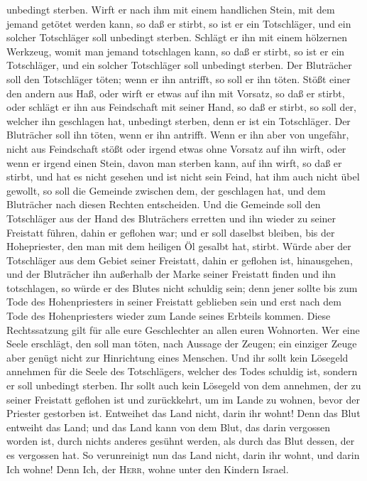 unbedingt sterben.  Wirft er nach ihm mit einem
handlichen Stein, mit dem jemand getötet werden kann, so daß er stirbt,
so ist er ein Totschläger, und ein solcher Totschläger soll unbedingt
sterben.  Schlägt er ihn mit einem hölzernen Werkzeug,
womit man jemand totschlagen kann, so daß er stirbt, so ist er ein
Totschläger, und ein solcher Totschläger soll unbedingt sterben.
 Der Bluträcher soll den Totschläger töten; wenn er ihn
antrifft, so soll er ihn töten.  Stößt einer den andern
aus Haß, oder wirft er etwas auf ihn mit Vorsatz, so daß er stirbt,
 oder schlägt er ihn aus Feindschaft mit seiner Hand, so
daß er stirbt, so soll der, welcher ihn geschlagen hat, unbedingt
sterben, denn er ist ein Totschläger. Der Bluträcher soll ihn töten,
wenn er ihn antrifft.  Wenn er ihn aber von ungefähr,
nicht aus Feindschaft stößt oder irgend etwas ohne Vorsatz auf ihn
wirft,  oder wenn er irgend einen Stein, davon man
sterben kann, auf ihn wirft, so daß er stirbt, und hat es nicht gesehen
und ist nicht sein Feind, hat ihm auch nicht übel gewollt,
 so soll die Gemeinde zwischen dem, der geschlagen hat,
und dem Bluträcher nach diesen Rechten entscheiden.  Und
die Gemeinde soll den Totschläger aus der Hand des Bluträchers erretten
und ihn wieder zu seiner Freistatt führen, dahin er geflohen war; und er
soll daselbst bleiben, bis der Hohepriester, den man mit dem heiligen Öl
gesalbt hat, stirbt.  Würde aber der Totschläger aus dem
Gebiet seiner Freistatt, dahin er geflohen ist, 
hinausgehen, und der Bluträcher ihn außerhalb der Marke seiner Freistatt
finden und ihn totschlagen, so würde er des Blutes nicht schuldig sein;
 denn jener sollte bis zum Tode des Hohenpriesters in
seiner Freistatt geblieben sein und erst nach dem Tode des
Hohenpriesters wieder zum Lande seines Erbteils kommen. 
Diese Rechtssatzung gilt für alle eure Geschlechter an allen euren
Wohnorten.  Wer eine Seele erschlägt, den soll man töten,
nach Aussage der Zeugen; ein einziger Zeuge aber genügt nicht zur
Hinrichtung eines Menschen.  Und ihr sollt kein Lösegeld
annehmen für die Seele des Totschlägers, welcher des Todes schuldig ist,
sondern er soll unbedingt sterben.  Ihr sollt auch kein
Lösegeld von dem annehmen, der zu seiner Freistatt geflohen ist und
zurückkehrt, um im Lande zu wohnen, bevor der Priester gestorben ist.
 Entweihet das Land nicht, darin ihr wohnt! Denn das Blut
entweiht das Land; und das Land kann von dem Blut, das darin vergossen
worden ist, durch nichts anderes gesühnt werden, als durch das Blut
dessen, der es vergossen hat.  So verunreinigt nun das
Land nicht, darin ihr wohnt, und darin Ich wohne! Denn Ich, der
\textsc{Herr}, wohne unter den Kindern Israel.

